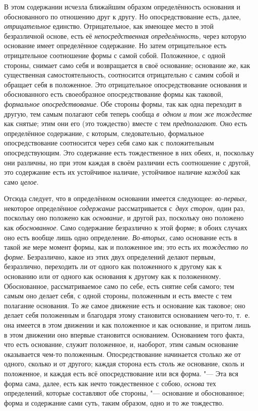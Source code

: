 В этом содержании исчезла ближайшим образом определённость основания и
обоснованного по отношению друг к другу. Но опосредствование есть, далее,
{\em отрицательное} единство. Отрицательное, как имеющее место в этой
безразличной основе, есть её {\em непосредственная определённость,} через
которую основание имеет определённое содержание. Но затем отрицательное есть
отрицательное соотношение формы с самой собой. Положенное, с одной стороны,
снимает само себя и возвращается в своё основание; основание же, как
существенная самостоятельность, соотносится отрицательно с самим собой и
обращает себя в положенное. Это отрицательное опосредствование основания и
обоснованного есть своеобразное опосредствование формы как таковой,
{\em формальное опосредствование}. Обе стороны формы, так как одна переходит в
другую, тем самым полагают себя теперь сообща {\em в~одном и том же тождестве}
как снятые; этим они его (это тождество) вместе с тем {\em предполагают}. Оно
есть определённое содержание, с которым, следовательно, формальное
опосредствование соотносится через себя само как с положительным
опосредствующим. Это содержание есть тождественное в них обеих, и, поскольку
они различны, но при этом каждая в своём различии есть соотношение с другой,
это содержание есть их устойчивое наличие, устойчивое наличие {\em каждой} как
само {\em целое}.

Отсюда следует, что в определённом основании имеется следующее:
{\em во-первых,} некоторое определённое {\em содержание} рассматривается
с~{\em двух сторон,} один раз, поскольку оно положено как {\em основание,} и
другой раз, поскольку оно положено как {\em обоснованное}. Само содержание
безразлично к этой форме; в обоих случаях оно есть вообще лишь одно
определение. {\em Во-вторых,} само основание есть в такой же мере момент формы,
как и положенное им; это есть их {\em тождество по форме}. Безразлично, какое
из этих двух определений делают первым, безразлично, переходить ли от одного
как положенного к другому как к основанию или от одного как основания к другому
как к положенному. Обоснованное, рассматриваемое само по себе, есть снятие себя
самого; тем самым оно делает себя, с одной стороны, положенным и есть вместе с
тем полагание основания. То же самое движение есть и основание как таковое; оно
делает себя положенным и благодаря этому становится основанием чего-то, т.~е.
она имеется в этом движении и как положенное и как основание, и притом лишь в
этом движении оно впервые становится основанием. Основанием того факта, что
есть основание, служит положенное, и, наоборот, этим самым основание
оказывается чем-то положенным. Опосредствование начинается столько же от
одного, сколько и от другого; каждая сторона есть столь же основание, сколь и
положенное, и каждая есть всё опосредствование или вся форма. "--- Эта вся
форма сама, далее, есть как нечто тождественное с собою, {\em основа} тех
определений, которые составляют обе стороны, "--- основание и обоснованное;
форма и содержание сами суть, таким образом, одно и то же тождество.

